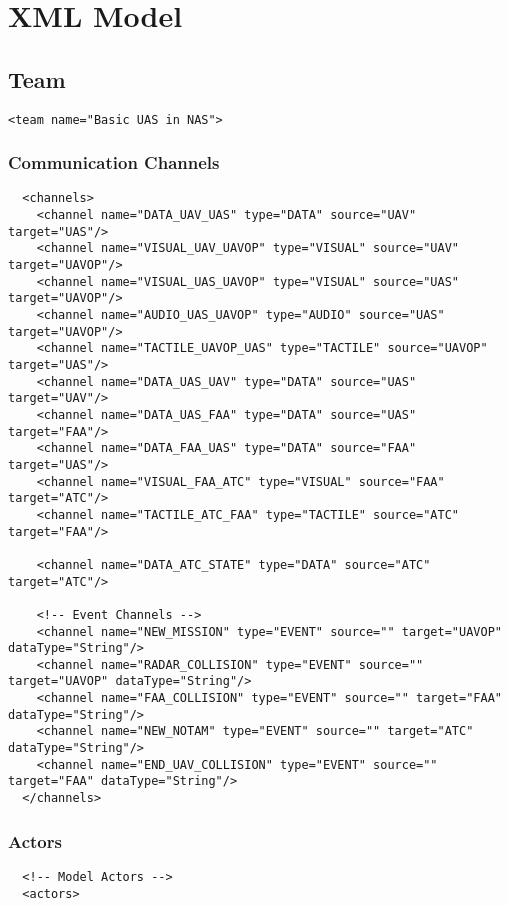 \chapter{XML Model}
\section{Team}
\begin{verbatim}
<team name="Basic UAS in NAS">
\end{verbatim}
\subsection{Communication Channels}
\begin{verbatim}
  <channels>
    <channel name="DATA_UAV_UAS" type="DATA" source="UAV" target="UAS"/>
    <channel name="VISUAL_UAV_UAVOP" type="VISUAL" source="UAV" target="UAVOP"/>
    <channel name="VISUAL_UAS_UAVOP" type="VISUAL" source="UAS" target="UAVOP"/>
    <channel name="AUDIO_UAS_UAVOP" type="AUDIO" source="UAS" target="UAVOP"/>
    <channel name="TACTILE_UAVOP_UAS" type="TACTILE" source="UAVOP" target="UAS"/>
    <channel name="DATA_UAS_UAV" type="DATA" source="UAS" target="UAV"/>
    <channel name="DATA_UAS_FAA" type="DATA" source="UAS" target="FAA"/>
    <channel name="DATA_FAA_UAS" type="DATA" source="FAA" target="UAS"/>
    <channel name="VISUAL_FAA_ATC" type="VISUAL" source="FAA" target="ATC"/>
    <channel name="TACTILE_ATC_FAA" type="TACTILE" source="ATC" target="FAA"/>
    
    <channel name="DATA_ATC_STATE" type="DATA" source="ATC" target="ATC"/>   
  
    <!-- Event Channels -->
    <channel name="NEW_MISSION" type="EVENT" source="" target="UAVOP" dataType="String"/>
    <channel name="RADAR_COLLISION" type="EVENT" source="" target="UAVOP" dataType="String"/>   
    <channel name="FAA_COLLISION" type="EVENT" source="" target="FAA" dataType="String"/>
    <channel name="NEW_NOTAM" type="EVENT" source="" target="ATC" dataType="String"/>   
    <channel name="END_UAV_COLLISION" type="EVENT" source="" target="FAA" dataType="String"/>
  </channels>
\end{verbatim}

\subsection{Actors}
\begin{verbatim}
  <!-- Model Actors -->
  <actors>
\end{verbatim}
